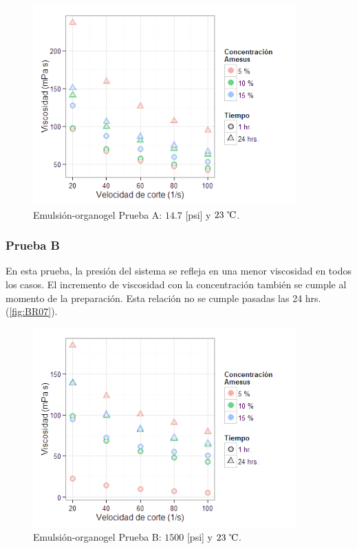     \begin{figure}[h]
        \centering
        \includegraphics[width=0.9\textwidth]{R_plot/Rplot06.png}
        \caption[Prueba A emulsión organogel]{Emulsión-organogel Prueba A: $14.7$ [psi] y $23~\celsius$.}
        \label{fig:AR06}
    \end{figure}
    
    \subsubsection{Prueba B}
    En esta prueba, la presión del sistema se refleja en una menor viscosidad en todos los casos. El incremento de viscosidad con la concentración también se cumple al momento de la preparación. Esta relación no se cumple pasadas las 24 hrs. (\autoref{fig:BR07}).
    
    \begin{figure}[h]
        \centering
        \includegraphics[width=0.9\textwidth]{R_plot/Rplot07.png}
        \caption[Prueba B emulsión organogel]{Emulsión-organogel Prueba B: $1500$ [psi] y $23~\celsius$.}
        \label{fig:BR07}
    \end{figure}

